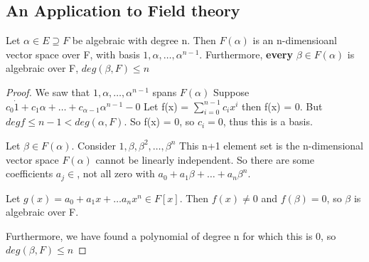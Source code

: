 \documentclass[main.tex]{subfiles}
\begin{document}
\subsection{An Application to Field theory}

\begin{theorem}
    Let $\alpha \in E \supseteq F$ be algebraic with degree n. Then $F(\alpha)$ is an n-dimensioanl vector space over F, with basis ${1, \alpha, \dots, \alpha^{n-1}}$. Furthermore, \textbf{every} $\beta \in F(\alpha)$ is algebraic over F, $deg(\beta, F) \leq n$
\end{theorem}
\begin{proof}\leavevmode
    We saw that ${1, \alpha, \dots, \alpha^{n-1}}$ spans $F(\alpha)$
    Suppose $c_0 \dot 1 + c_1 \alpha + \dots + c_{\alpha-1}\alpha^{n-1} - 0$
    Let f(x) = $\sum_{i=0}^{n-1}c_ix^i $ then f(x) = 0. But $degf \leq n-1 < deg(\alpha, F)$. So f(x) = 0, so $c_i = 0$, thus this is a basis. 


    Let $\beta \in F(\alpha)$. Consider ${1, \beta, \beta^2, \dots, \beta^n}$ This n+1 element set is the n-dimensional vector space $F(\alpha)$ cannot be linearly independent. So there are some coefficients $a_j \in$, not all zero with $a_0 + a_1 \beta + \dots + a_n \beta^n$. 

    Let $g(x) = a_0 + a_1x + \dots a_nx^n \in F[x]$. Then $f(x) \neq 0$ and $f(\beta) = 0$, so $\beta$ is algebraic over F.

    Furthermore, we have found a polynomial of degree n for which this is 0, so $deg(\beta, F) \leq n$
\end{proof}
\end{document}
